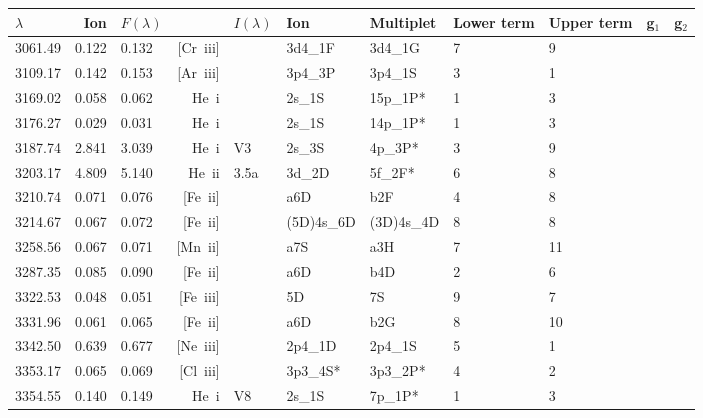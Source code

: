  \begin{longtable}{lrlrlllllll}
 \hline
 $ \lambda $ & Ion & $F \left( \lambda \right) $ && $I \left( \lambda \right) $ & Ion & Multiplet & Lower term & Upper term & g$_1$ & g$_2$ \\
 \hline
 3061.49 &   0.122 &   0.132 &  [Cr~{\sc iii}]  &            &  3d4_1F    &  3d4_1G    &          7 &        9    \\
 3109.17 &   0.142 &   0.153 &  [Ar~{\sc iii}]  &            &  3p4_3P    &  3p4_1S    &          3 &        1    \\
 3169.02 &   0.058 &   0.062 &  He~{\sc i}      &            &  2s_1S     &  15p_1P*   &          1 &        3    \\
 3176.27 &   0.029 &   0.031 &  He~{\sc i}      &            &  2s_1S     &  14p_1P*   &          1 &        3    \\
 3187.74 &   2.841 &   3.039 &  He~{\sc i}      &  V3        &  2s_3S     &  4p_3P*    &          3 &        9    \\
 3203.17 &   4.809 &   5.140 &  He~{\sc ii}     &  3.5a      &  3d_2D     &  5f_2F*    &          6 &        8    \\
 3210.74 &   0.071 &   0.076 &  [Fe~{\sc ii}]   &            &  a6D       &  b2F       &          4 &        8    \\
 3214.67 &   0.067 &   0.072 &  [Fe~{\sc ii}]   &            &  (5D)4s_6D &  (3D)4s_4D &          8 &        8    \\
 3258.56 &   0.067 &   0.071 &  [Mn~{\sc ii}]   &            &  a7S       &  a3H       &          7 &       11    \\
 3287.35 &   0.085 &   0.090 &  [Fe~{\sc ii}]   &            &  a6D       &  b4D       &          2 &        6    \\
 3322.53 &   0.048 &   0.051 &  [Fe~{\sc iii}]  &            &  5D        &  7S        &          9 &        7    \\
 3331.96 &   0.061 &   0.065 &  [Fe~{\sc ii}]   &            &  a6D       &  b2G       &          8 &       10    \\
 3342.50 &   0.639 &   0.677 &  [Ne~{\sc iii}]  &            &  2p4_1D    &  2p4_1S    &          5 &        1    \\
 3353.17 &   0.065 &   0.069 &  [Cl~{\sc iii}]  &            &  3p3_4S*   &  3p3_2P*   &          4 &        2    \\
 3354.55 &   0.140 &   0.149 &  He~{\sc i}      &  V8        &  2s_1S     &  7p_1P*    &          1 &        3    \\

\end{longtable}
